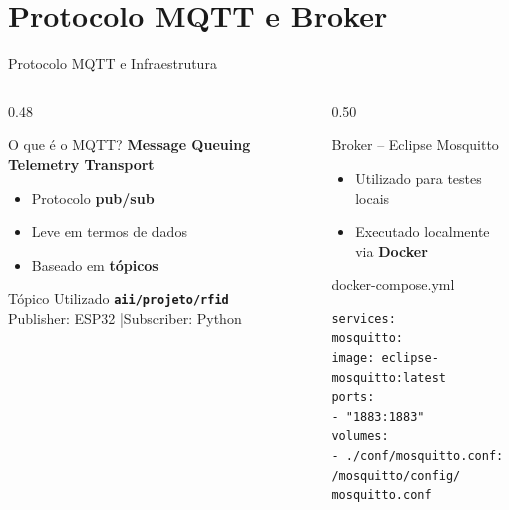 \documentclass[aspectratio=169, 12pt]{beamer}
\begin{document}
  \section{Protocolo MQTT e Broker}
  \begin{frame}[fragile]{Protocolo MQTT e Infraestrutura}
    \begin{columns}[T]
      \begin{column}{0.48\textwidth}
        \begin{block}{O que \'{e} o MQTT?}
          \textbf{Message Queuing Telemetry Transport}
          \begin{itemize}
            \item Protocolo \textbf{pub/sub}
            \item Leve em termos de dados
            \item Baseado em \textbf{t\'{o}picos}
          \end{itemize}
        \end{block}
        \vspace{0.4em}
        \begin{block}{T\'{o}pico Utilizado}
          \centering
          \large\texttt{\textbf{aii/projeto/rfid}}\\[0.3em]
          \footnotesize Publisher: ESP32 \quad|\quad Subscriber: Python
        \end{block}
      \end{column}
      \begin{column}{0.50\textwidth}
        \begin{block}{Broker -- Eclipse Mosquitto}
          \begin{itemize}
            \item Utilizado para testes locais 
            \item Executado localmente via \textbf{Docker}
          \end{itemize}
        \end{block}
        \vspace{0.3em}
        \begin{exampleblock}{docker-compose.yml}
          \begin{lstlisting}[style=bash]
services:
mosquitto:
image: eclipse-mosquitto:latest
ports:
- "1883:1883"
volumes:
- ./conf/mosquitto.conf:
/mosquitto/config/
mosquitto.conf
          \end{lstlisting}
        \end{exampleblock}
      \end{column}
    \end{columns}
  \end{frame}
\end{document}
